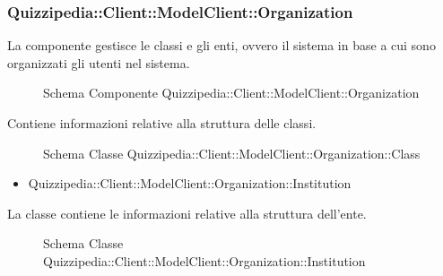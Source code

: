 \subsubsection{Quizzipedia::Client::ModelClient::Organization}
La componente gestisce le classi e gli enti, ovvero il sistema in base a cui sono organizzati gli utenti nel sistema.
\begin{figure}[H]
\centering
\noindent{}
\caption{Schema Componente Quizzipedia::Client::ModelClient::Organization}
\end{figure}
Contiene informazioni relative alla struttura delle classi.
\begin{figure}[H]
\centering
\noindent{}
\caption{Schema Classe Quizzipedia::Client::ModelClient::Organization::Class}
\end{figure}
\begin{itemize}
\item Quizzipedia::Client::ModelClient::Organization::Institution
\end{itemize}
La classe contiene le informazioni relative alla struttura dell'ente.
\begin{figure}[H]
\centering
\noindent{}
\caption{Schema Classe Quizzipedia::Client::ModelClient::Organization::Institution}
\end{figure}
